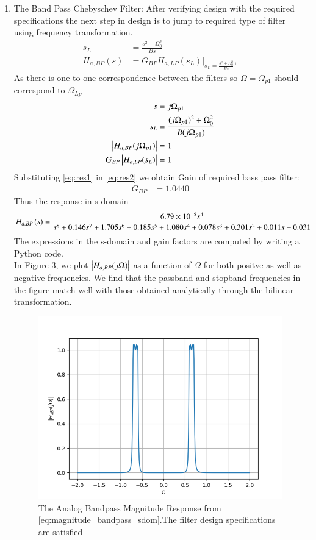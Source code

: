 \documentclass{article}
\begin{document}
\begin{enumerate}
\item {The Band Pass Chebyschev Filter:}
After verifying design with the required specifications the next step in design is to jump to required type of filter using frequency transformation.
\begin{align}
    s_L &= \frac{s^2 + \Omega_0^2}{Bs} \\
    H_{a,BP}(s) &= G_{BP}H_{a,LP}(s_L)\vert_{s_L = \frac{s^2 + \Omega_0^2}{Bs}},
\end{align}
As there is one to one correspondence between the filters so $\Omega=\Omega_{p1}$ should correspond to $\Omega_{Lp}$
\begin{align}
    s &= j\Omega_{p1}\\
    s_{L} &= \frac{(j\Omega_{p1})^2 + \Omega_0^2}{B(j\Omega_{p1})} \label{eq:res1} \\
    \left\vert H_{a,BP}(j\Omega_{p1})\right\vert &= 1 \\
    G_{BP}\left\vert H_{a,LP}(s_L)\right\vert &= 1 \label{eq:res2}
\end{align}
Substituting \eqref{eq:res1} in \eqref{eq:res2} we obtain Gain of required bass pass filter:
\begin{align}
    G_{BP} &= 1.0440
\end{align}
Thus the response in s domain
\begin{align}
    H_{a,BP}\left(s\right) &= \frac{6.79\times 10^{-5}s^4}{s^8 + 0.146s^7 + 1.705s^6 + 0.185s^5 + 1.080s^4 + 0.078s^3 + 0.301s^2 + 0.011s + 0.031} \label{eq:magnitude_bandpass_sdom}
\end{align}
The expressions in the s-domain and gain factors are computed by writing a Python code. \\
In Figure 3, we plot $\left\vert H_{a,BP}(j\Omega)\right\vert$ as a function of $\Omega$ for both positve as
well as negative frequencies.  We find that the passband and stopband frequencies in the figure
match well with those obtained analytically through the bilinear transformation.
\begin{figure}[ht]
\centering
\includegraphics[width=1\columnwidth]{figs/H_BP.png}
\caption{The Analog Bandpass Magnitude Response from \eqref{eq:magnitude_bandpass_sdom}.The filter design specifications are satisfied}
\label{fig:band_pass_filter}
\end{figure}
\end{enumerate}
\end{document}
